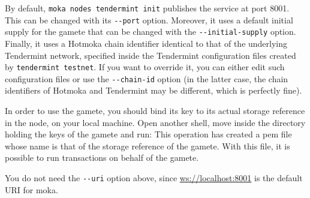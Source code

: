 \begin{commentbox}
By default, \texttt{moka nodes tendermint init} publishes the service at port 8001.
This can be changed with its \texttt{-{}-port} option. Moreover, it uses a default
initial supply for the gamete that can be changed with the \texttt{-{}-initial-supply} option.
Finally, it uses a Hotmoka chain identifier identical to that of the underlying Tendermint
network, specified inside the Tendermint configuration files created by \texttt{tendermint testnet}.
If you want to override it, you can either
edit such configuration files or use the \texttt{-{}-chain-id} option (in the latter case,
the chain identifiers of Hotmoka and Tendermint may be different, which is perfectly fine).
\end{commentbox}

In order to use the gamete, you should bind its key to its actual storage
reference in the node, on your local machine. Open another shell,
move inside the directory holding the keys of the gamete and run:
%
%
This operation has created a pem file whose name is that of the storage reference of the gamete.
With this file, it is possible to run transactions on behalf of the gamete.
%
\begin{commentbox}
You do not need the \texttt{-{}-uri} option above, since \url{ws://localhost:8001} is the default
URI for moka.
\end{commentbox}


